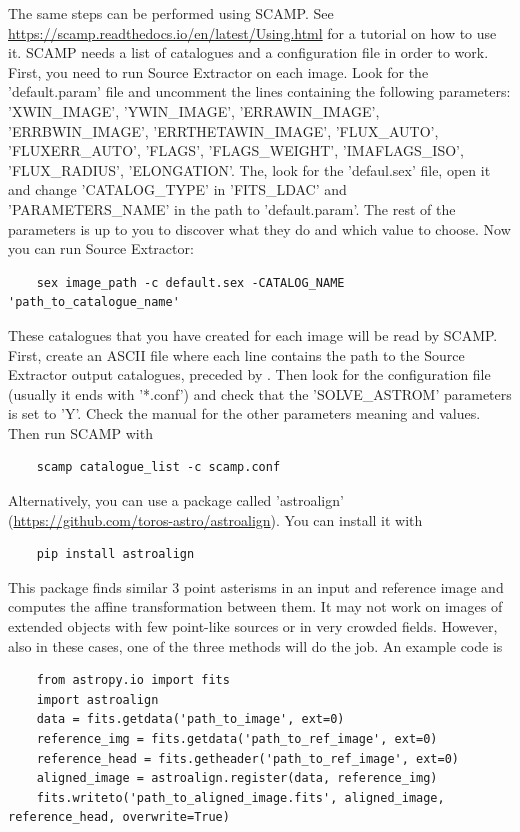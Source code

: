 \documentclass[a4paper, 11pt, fleqn]{memoir}
\begin{document}
The same steps can be performed using SCAMP.
See \url{https://scamp.readthedocs.io/en/latest/Using.html} for a tutorial on how to use it.
SCAMP needs a list of catalogues and a configuration file in order to work.
First, you need to run Source Extractor on each image.
Look for the 'default.param' file and uncomment the lines containing the following parameters: 'XWIN\_IMAGE', 'YWIN\_IMAGE', 'ERRAWIN\_IMAGE', 'ERRBWIN\_IMAGE', 'ERRTHETAWIN\_IMAGE', 'FLUX\_AUTO', 'FLUXERR\_AUTO', 'FLAGS', 'FLAGS\_WEIGHT', 'IMAFLAGS\_ISO', 'FLUX\_RADIUS', 'ELONGATION'.
The, look for the 'defaul.sex' file, open it and change 'CATALOG\_TYPE' in 'FITS\_LDAC' and 'PARAMETERS\_NAME' in the path to 'default.param'.
The rest of the parameters is up to you to discover what they do and which value to choose.
Now you can run Source Extractor:
\begin{verbatim}
    sex image_path -c default.sex -CATALOG_NAME 'path_to_catalogue_name'
\end{verbatim}
These catalogues that you have created for each image will be read by SCAMP.
First, create an ASCII file where each line contains the path to the Source Extractor output catalogues, preceded by \@.
Then look for the configuration file (usually it ends with '*.conf') and check that the 'SOLVE\_ASTROM' parameters is set to 'Y'.
Check the manual for the other parameters meaning and values.
Then run SCAMP with
\begin{verbatim}
    scamp catalogue_list -c scamp.conf
\end{verbatim}

Alternatively, you can use a  package called 'astroalign' (\url{https://github.com/toros-astro/astroalign}).
You can install it with
\begin{verbatim}
    pip install astroalign
\end{verbatim}
This package finds similar 3 point asterisms in an input and reference image and computes the affine transformation between them.
It may not work on images of extended objects with few point-like sources or in very crowded fields.
However, also in these cases, one of the three methods will do the job.
An example code is
\begin{verbatim}
    from astropy.io import fits
    import astroalign
    data = fits.getdata('path_to_image', ext=0)
    reference_img = fits.getdata('path_to_ref_image', ext=0)
    reference_head = fits.getheader('path_to_ref_image', ext=0)
    aligned_image = astroalign.register(data, reference_img)
    fits.writeto('path_to_aligned_image.fits', aligned_image, reference_head, overwrite=True)
\end{verbatim}
\end{document}
